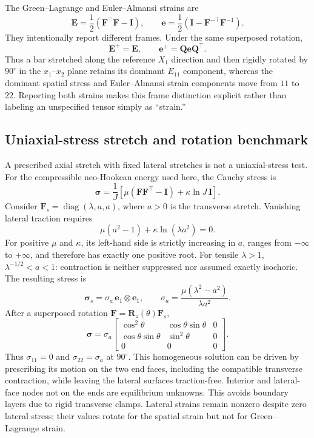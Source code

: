 \documentclass[11pt,a4paper]{article}
\newcommand{\bs}[1]{\boldsymbol{#1}}
\newcommand{\I}{\bs{I}}
\newcommand{\F}{\bs{F}}
\newcommand{\sig}{\bs{\sigma}}
\begin{document}
The Green--Lagrange and Euler--Almansi strains are
\begin{equation}
\bs E=\frac12(\F^\top\F-\I),
\qquad
\bs e=\frac12(\I-\F^{-\top}\F^{-1}).
\end{equation}
They intentionally report different frames. Under the same superposed rotation,
\begin{equation}
\bs E^+=\bs E,
\qquad
\bs e^+=\bs Q\bs e\bs Q^\top.
\label{eq:superposed-rotation-strain}
\end{equation}
Thus a bar stretched along the reference $X_1$ direction and then rigidly rotated by $90^\circ$ in the $x_1$--$x_2$ plane retains its dominant $E_{11}$ component, whereas the dominant spatial stress and Euler--Almansi strain components move from $11$ to $22$. Reporting both strains makes this frame distinction explicit rather than labeling an unspecified tensor simply as ``strain.''

\subsection{Uniaxial-stress stretch and rotation benchmark}

A prescribed axial stretch with fixed lateral stretches is not a uniaxial-stress test.
For the compressible neo-Hookean energy used here, the Cauchy stress is
\begin{equation}
\sig=\frac{1}{J}\left[\mu(\F\F^\top-\bs I)+\kappa\ln J\,\bs I\right].
\end{equation}
Consider $\F_s=\operatorname{diag}(\lambda,a,a)$, where $a>0$ is the transverse stretch.
Vanishing lateral traction requires
\begin{equation}
\mu(a^2-1)+\kappa\ln(\lambda a^2)=0.
\label{eq:uniaxial-lateral-stretch}
\end{equation}
For positive $\mu$ and $\kappa$, its left-hand side is strictly increasing in $a$, ranges from
$-\infty$ to $+\infty$, and therefore has exactly one positive root. For tensile $\lambda>1$,
$\lambda^{-1/2}<a<1$: contraction is neither suppressed nor assumed exactly isochoric.
The resulting stress is
\begin{equation}
\sig_s=\sigma_a\,\bs e_1\otimes\bs e_1,
\qquad \sigma_a=\frac{\mu(\lambda^2-a^2)}{\lambda a^2}.
\end{equation}
After a superposed rotation $\F=\bs R_z(\theta)\F_s$,
\begin{equation}
\sig=\sigma_a
\begin{bmatrix}
\cos^2\theta & \cos\theta\sin\theta & 0\\
\cos\theta\sin\theta & \sin^2\theta & 0\\
0&0&0
\end{bmatrix}.
\end{equation}
Thus $\sigma_{11}=0$ and $\sigma_{22}=\sigma_a$ at $90^\circ$. This homogeneous solution can be driven
by prescribing its motion on the two end faces, including the compatible transverse contraction, while leaving
the lateral surfaces traction-free. Interior and lateral-face nodes not on the ends are equilibrium unknowns.
This avoids boundary layers due to rigid transverse clamps. Lateral strains remain nonzero despite zero lateral
stress; their values rotate for the spatial strain but not for Green--Lagrange strain.
\end{document}
